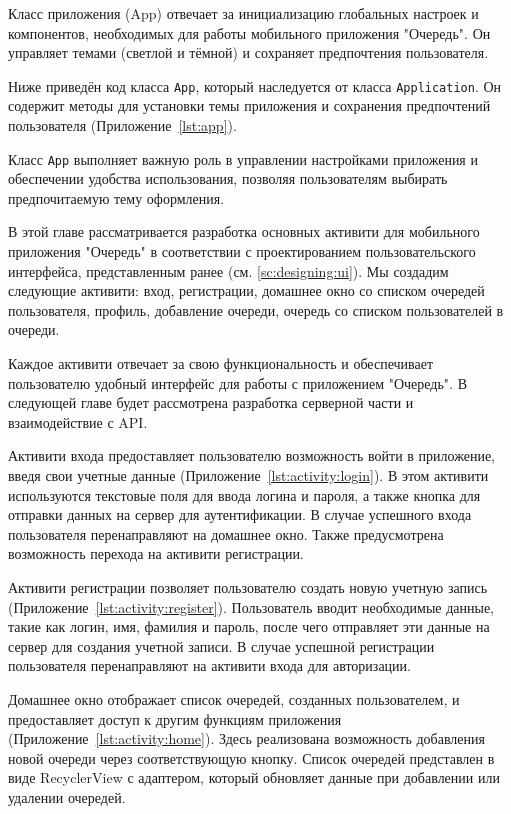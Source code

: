 
Класс приложения (App) отвечает за инициализацию глобальных настроек
и компонентов, необходимых для работы мобильного приложения "Очередь".
Он управляет темами (светлой и тёмной)
и сохраняет предпочтения пользователя.\par
Ниже приведён код класса \texttt{App},
который наследуется от класса \texttt{Application}.
Он содержит методы для установки темы приложения
и сохранения предпочтений пользователя (Приложение~\ref{lst:app}).\par
Класс \texttt{App} выполняет важную роль в управлении настройками приложения
и обеспечении удобства использования,
позволяя пользователям выбирать предпочитаемую тему оформления.


В этой главе рассматривается разработка основных активити
для мобильного приложения "Очередь"
в соответствии с проектированием пользовательского интерфейса,
представленным ранее (см. \ref{sc:designing:ui}).
Мы создадим следующие активити:
вход, регистрации, домашнее окно со списком очередей пользователя,
профиль, добавление очереди, очередь со списком пользователей в очереди.\par
Каждое активити отвечает за свою функциональность
и обеспечивает пользователю удобный интерфейс для работы
с приложением "Очередь". В следующей главе будет рассмотрена разработка
серверной части и взаимодействие с API.

Активити входа предоставляет пользователю возможность войти
в приложение, введя свои учетные данные (Приложение~\ref{lst:activity:login}).
В этом активити используются текстовые поля для ввода логина и пароля,
а также кнопка для отправки данных на сервер для аутентификации.
В случае успешного входа пользователя перенаправляют на домашнее окно.
Также предусмотрена возможность перехода на активити регистрации.

Активити регистрации позволяет пользователю создать новую учетную запись
(Приложение~\ref{lst:activity:register}).
Пользователь вводит необходимые данные, такие как логин, имя, фамилия и пароль,
после чего отправляет эти данные на сервер для создания учетной записи.
В случае успешной регистрации пользователя перенаправляют на активити входа
для авторизации.

Домашнее окно отображает список очередей, созданных пользователем,
и предоставляет доступ к другим функциям приложения
(Приложение~\ref{lst:activity:home}).
Здесь реализована возможность добавления новой очереди
через соответствующую кнопку. Список очередей представлен в виде RecyclerView
с адаптером, который обновляет данные при добавлении или удалении очередей.

